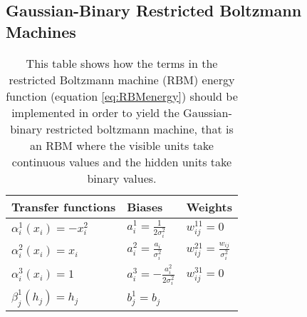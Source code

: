 \subsection{Gaussian-Binary Restricted Boltzmann Machines}


\begin{table*}\centering
{}
\caption{This table shows how the terms in the restricted Boltzmann machine (RBM) energy function (equation \ref{eq:RBMenergy}) should be implemented in order to yield the Gaussian-binary restricted boltzmann machine, that is an RBM where the visible units take continuous values and the hidden units take binary values.}
\label{tab:GBrbm}
\begin{tabular}{lll}
\toprule
\toprule
Transfer functions & Biases & Weights \\ 
\midrule 
$\alpha_i^1 (x_i) = -x_i^2$  & $a_i^1 = \frac{1}{2\sigma_i^2}$      & $w_{ij}^{11} = 0$ \\
$\alpha_i^2 (x_i) = x_i$     & $a_i^2 = \frac{a_i}{\sigma_i^2}$     & $w_{ij}^{21} = \frac{w_{ij}}{\sigma_i^2}$ \\
$\alpha_i^3 (x_i) = 1$       & $a_i^3 = -\frac{a_i^2}{2\sigma_i^2}$ & $w_{ij}^{31} = 0$ \\
$\beta_j^1 (h_j) = h_j$      & $b_j^1 = b_j$                        &  \\
\bottomrule
\bottomrule
\end{tabular}
\end{table*}

